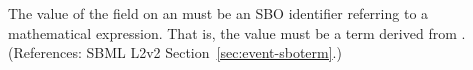 The value of the  field on an \Event must be an SBO
identifier referring to a mathematical expression.  That is, the value must
be a term derived from \sbomathformula.  (References: SBML L2v2
Section~\ref{sec:event-sboterm}.)
